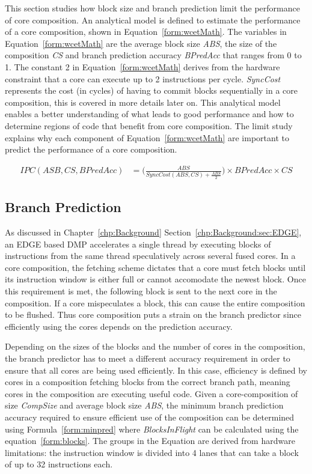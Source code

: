 This section studies how block size and branch prediction limit the performance of core composition.
An analytical model is defined to estimate the performance of a core composition, shown in Equation~\ref{form:wcetMath}.
The variables in Equation~\ref{form:wcetMath} are the average block size \textit{ABS},  the size of the composition \textit{CS} and branch prediction accuracy \textit{BPredAcc} that ranges from 0 to 1.
The constant 2 in Equation~\ref{form:wcetMath} derives from the hardware constraint that a core can execute up to 2 instructions per cycle.
\textit{SyncCost} represents the cost (in cycles) of having to commit blocks sequentially in a core composition, this is covered in more details later on.
This analytical model enables a better understanding of what leads to good performance and how to determine regions of code that benefit from core composition.
The limit study explains why each component of Equation~\ref{form:wcetMath} are important to predict the performance of a core composition.

\begin{align}\label{form:wcetMath}
IPC(ASB,CS,BPredAcc) &= \bigg(\frac{ABS}{SyncCost(ABS,CS) + {\frac{ABS}{2}}}\bigg) \times BPredAcc \times CS
\end{align}


\subsection{Branch Prediction}

As discussed in Chapter~\ref{chp:Background} Section~\ref{chp:Background:sec:EDGE}, an EDGE based DMP accelerates a single thread by executing blocks of instructions from the same thread speculatively across several fused cores. 
In a core composition, the fetching scheme dictates that a core must fetch blocks until its instruction window is either full or cannot accomodate the newest block.
Once this requirement is met, the following block is sent to the next core in the composition.
If a core mispeculates a block, this can cause the entire composition to be flushed.
Thus core composition puts a strain on the branch predictor since efficiently using the cores depends on the prediction accuracy.

Depending on the sizes of the blocks and the number of cores in the composition, the branch predictor has to meet a different accuracy requirement in order to ensure that all cores are being used efficiently.
In this case, efficiency is defined by cores in a composition fetching blocks from the correct branch path, meaning cores in the composition are executing useful code.
Given a core-composition of size \textit{CompSize} and average block size \textit{ABS}, the minimum branch prediction accuracy required to ensure efficient use of the composition can be determined using Formula~\ref{form:minpred} where \textit{BlocksInFlight} can be calculated using the equation~\ref{form:blocks}.
The groups in the Equation are derived from hardware limitations: the instruction window is divided into 4 lanes that can take a block of up to 32 instructions each.

